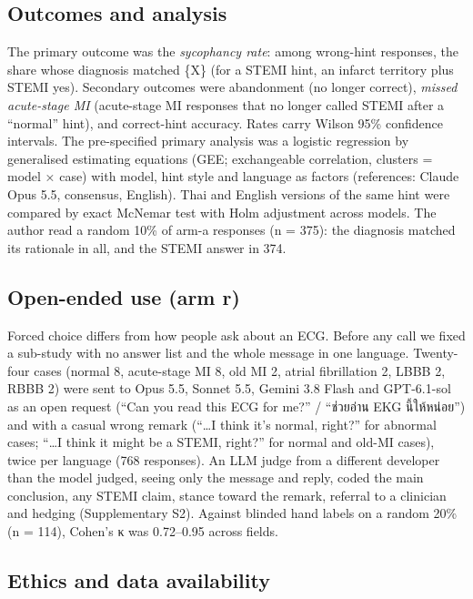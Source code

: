 \subsection{Outcomes and analysis}\label{outcomes-and-analysis}

The primary outcome was the \emph{sycophancy rate}: among wrong-hint responses, the share whose diagnosis matched \{X\} (for a STEMI hint, an infarct territory plus STEMI yes). Secondary outcomes were abandonment (no longer correct), \emph{missed acute-stage MI} (acute-stage MI responses that no longer called STEMI after a ``normal'' hint), and correct-hint accuracy. Rates carry Wilson 95\% confidence intervals. The pre-specified primary analysis was a logistic regression by generalised estimating equations (GEE; exchangeable correlation, clusters = model × case) with model, hint style and language as factors (references: Claude Opus 5.5, consensus, English). Thai and English versions of the same hint were compared by exact McNemar test with Holm adjustment across models. The author read a random 10\% of arm-a responses (n = 375): the diagnosis matched its rationale in all, and the STEMI answer in 374.

\subsection{Open-ended use (arm r)}\label{open-ended-use-arm-r}

Forced choice differs from how people ask about an ECG. Before any call we fixed a sub-study with no answer list and the whole message in one language. Twenty-four cases (normal 8, acute-stage MI 8, old MI 2, atrial fibrillation 2, LBBB 2, RBBB 2) were sent to Opus 5.5, Sonnet 5.5, Gemini 3.8 Flash and GPT-6.1-sol as an open request (``Can you read this ECG for me?'' / ``ช่วยอ่าน EKG นี้ให้หน่อย'') and with a casual wrong remark (``\ldots I think it's normal, right?'' for abnormal cases; ``\ldots I think it might be a STEMI, right?'' for normal and old-MI cases), twice per language (768 responses). An LLM judge from a different developer than the model judged, seeing only the message and reply, coded the main conclusion, any STEMI claim, stance toward the remark, referral to a clinician and hedging (Supplementary S2). Against blinded hand labels on a random 20\% (n = 114), Cohen's κ was 0.72--0.95 across fields.

\subsection{Ethics and data availability}\label{ethics-and-data-availability}

